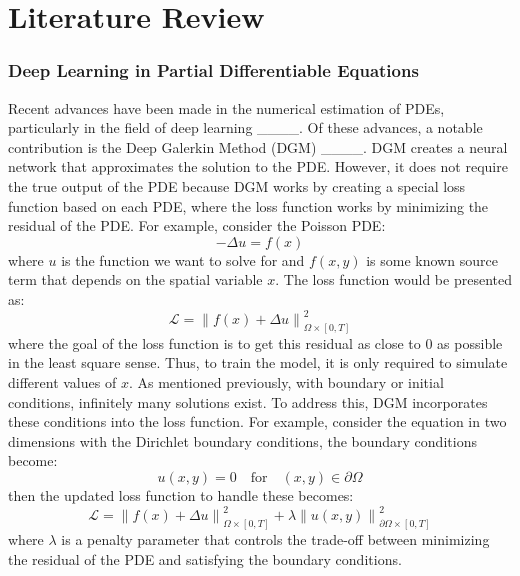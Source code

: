 \section{Literature Review}
\label{sec:Methodology}
\subsubsection{Deep Learning in Partial Differentiable Equations}
Recent advances have been made in the numerical estimation of PDEs, particularly in the field of deep learning ____. Of these advances, a notable contribution is the Deep Galerkin Method (DGM) ____. DGM creates a neural network that approximates the solution to the PDE. However, it does not require the true output of the PDE because DGM works by creating a special loss function based on each PDE, where the loss function works by minimizing the residual of the PDE. For example, consider the Poisson PDE:
\begin{equation*}
    -\Delta u = f(x)
\end{equation*}
where \(u\) is the function we want to solve for and \(f(x, y)\) is some known source term that depends on the spatial variable  \(x\). The loss function would be presented as:
\begin{equation*}
    \mathcal{L} = \left\| f(x) + \Delta u \right\|^2_{\Omega \times [0,T]}
\end{equation*}
where the goal of the loss function is to get this residual as close to \(0\) as possible in the least square sense. Thus, to train the model, it is only required to simulate different values of \(x\). As mentioned previously, with boundary or initial conditions, infinitely many solutions exist. To address this, DGM incorporates these conditions into the loss function. For example, consider the equation in two dimensions with the Dirichlet boundary conditions, the boundary conditions become:
\begin{equation*}
    u(x, y) = 0 \quad \text{for} \quad (x, y) \in \partial\Omega
\end{equation*}
then the updated loss function to handle these becomes:
\begin{equation*}
    \mathcal{L} = \left\| f(x) + \Delta u \right\|^2_{\Omega \times [0,T]} + \lambda \left\| u(x, y) \right\|^2_{\partial\Omega \times [0,T]}
\end{equation*}
where \( \lambda \) is a penalty parameter that controls the trade-off between minimizing the residual of the PDE and satisfying the boundary conditions. 

